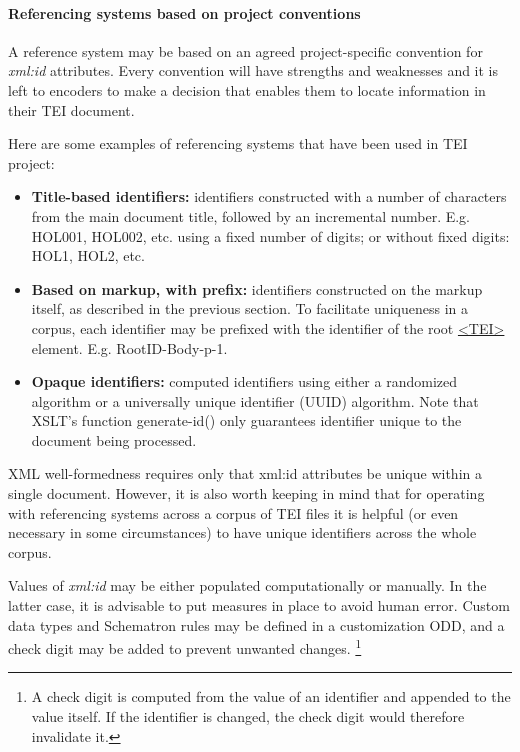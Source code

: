 \paragraph[{Referencing systems based on project conventions}]{Referencing systems based on project conventions}\label{CORS2-2}\par
A reference system may be based on an agreed project-specific convention for {\itshape xml:id} attributes. Every convention will have strengths and weaknesses and it is left to encoders to make a decision that enables them to locate information in their TEI document.\par
Here are some examples of referencing systems that have been used in TEI project: \begin{itemize}
\item \textbf{Title-based identifiers:} identifiers constructed with a number of characters from the main document title, followed by an incremental number. E.g. HOL001, HOL002, etc. using a fixed number of digits; or without fixed digits: HOL1, HOL2, etc.
\item \textbf{Based on markup, with prefix:} identifiers constructed on the markup itself, as described in the previous section. To facilitate uniqueness in a corpus, each identifier may be prefixed with the identifier of the root \hyperref[TEI.TEI]{<TEI>} element. E.g. RootID-Body-p-1.
\item \textbf{Opaque identifiers:} computed identifiers using either a randomized algorithm or a universally unique identifier (UUID) algorithm. Note that XSLT's function generate-id() only guarantees identifier unique to the document being processed.
\end{itemize} \par
XML well-formedness requires only that xml:id attributes be unique within a single document. However, it is also worth keeping in mind that for operating with referencing systems across a corpus of TEI files it is helpful (or even necessary in some circumstances) to have unique identifiers across the whole corpus.\par
Values of {\itshape xml:id} may be either populated computationally or manually. In the latter case, it is advisable to put measures in place to avoid human error. Custom data types and Schematron rules may be defined in a customization ODD, and a check digit may be added to prevent unwanted changes. \footnote{A check digit is computed from the value of an identifier and appended to the value itself. If the identifier is changed, the check digit would therefore invalidate it.}
